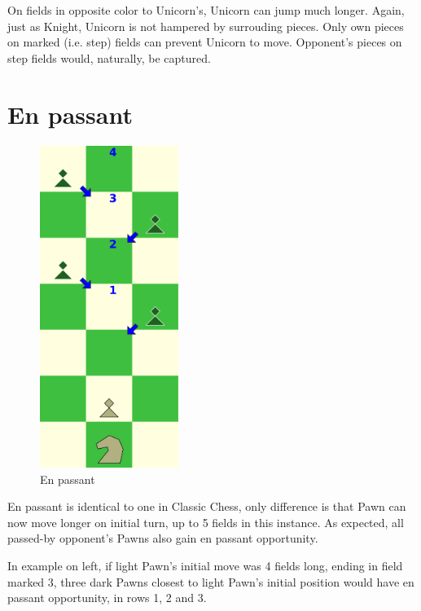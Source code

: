 \documentclass[a5paper,12pt,draft]{book} %
\begin{document}
On fields in opposite color to Unicorn's, Unicorn can jump much longer.
Again, just as Knight, Unicorn is not hampered by surrouding pieces.
Only own pieces on marked (i.e. step) fields can prevent Unicorn to move.
Opponent's pieces on step fields would, naturally, be captured.

\clearpage

\section*{En passant}

\noindent
\begin{figure}
\includegraphics[width=0.4\textwidth, keepaspectratio=true]{../gfx/en_passants/08_age_of_aquarius_en_passant.png}
\caption{En passant}
\label{fig:aoa_en_passant}
\end{figure}
En passant is identical to one in Classic Chess, only difference is that Pawn can now
move longer on initial turn, up to 5 fields in this instance. As expected, all passed-by
opponent's Pawns also gain en passant opportunity.

In example on left, if light Pawn's initial move was 4 fields long, ending in field marked
3, three dark Pawns closest to light Pawn's initial position would have en passant opportunity,
in rows 1, 2 and 3.
\end{document}
